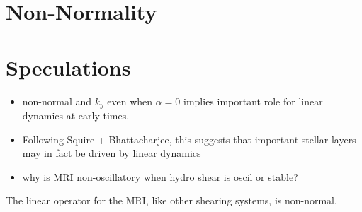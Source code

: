 \documentclass[aps,prl, reprint,superscriptaddress]{revtex4-1}
\begin{document}
\section{Non-Normality}
\label{sec:non-normality}

\section{Speculations}
\label{sec:speculations}

\begin{itemize}
\item non-normal and $k_y$ even when $\alpha = 0$ implies important role for linear dynamics at early times. 
\item Following Squire + Bhattacharjee, this suggests that important stellar layers may in fact be driven by linear dynamics
\item why is MRI non-oscillatory when hydro shear is oscil or stable?
\end{itemize}
The linear operator for the MRI, like other shearing systems, is non-normal. 

%


\end{document}
